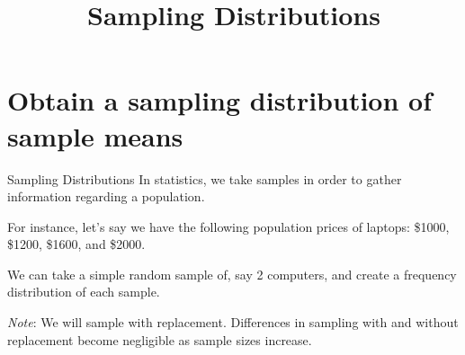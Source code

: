\documentclass[t]{beamer}
\title{Sampling Distributions}
\author{}
\date{}
\begin{document}

\begin{frame} 
\maketitle
\end{frame}

\section{Obtain a sampling distribution of sample means}

\begin{frame}{Sampling Distributions}
In statistics, we take samples in order to gather information regarding a population. \newline\\	\pause

For instance, let's say we have the following population prices of laptops: \$1000, \$1200, \$1600, and \$2000.	\newline\\	\pause

We can take a simple random sample of, say 2 computers, and create a frequency distribution of each sample.	\newline\\	\pause

\emph{Note}: We will sample with replacement. Differences in sampling with and without replacement become negligible as sample sizes increase.
\end{frame}
\end{document}
